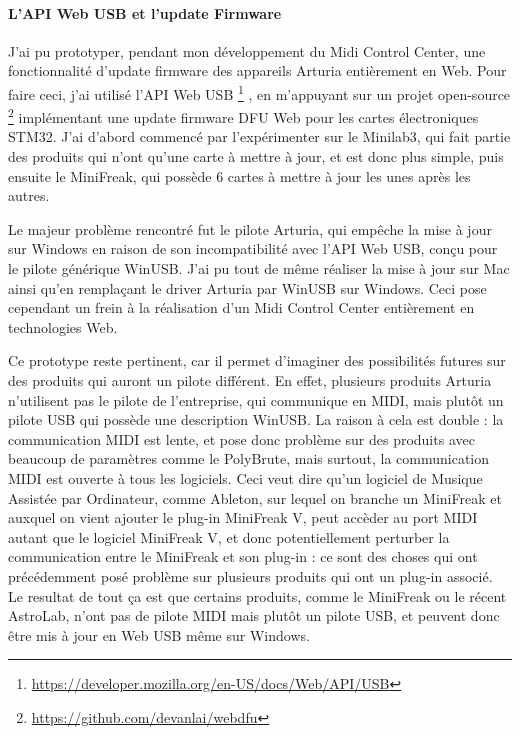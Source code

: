 \documentclass[francais]{rapportPFE}  %
\begin{document}
\paragraph{L'API Web USB et l'update Firmware}
J'ai pu prototyper, pendant mon développement du Midi Control Center, une fonctionnalité d'update firmware des appareils Arturia entièrement en Web. Pour faire ceci, j'ai utilisé l'API Web USB
\footnote{\url{https://developer.mozilla.org/en-US/docs/Web/API/USB}} 
, en m'appuyant sur un projet open-source 
\footnote{\url{https://github.com/devanlai/webdfu}} 
implémentant une update firmware DFU Web pour les cartes électroniques STM32.
J'ai d'abord commencé par l'expérimenter sur le Minilab3, qui fait partie des produits qui n'ont qu'une carte à mettre à jour, et est donc plus simple, puis ensuite le MiniFreak, qui possède 6 cartes à mettre à jour les unes après les autres.

Le majeur problème rencontré fut le pilote Arturia, qui empêche la mise à jour sur Windows en raison de son incompatibilité avec l'API Web USB, conçu pour le pilote générique WinUSB. J'ai pu tout de même réaliser la mise à jour sur Mac ainsi qu'en remplaçant le driver Arturia par WinUSB sur Windows. Ceci pose cependant un frein à la réalisation d'un Midi Control Center entièrement en technologies Web.

Ce prototype reste pertinent, car il permet d'imaginer des possibilités futures sur des produits qui auront un pilote différent.
En effet, plusieurs produits Arturia n'utilisent pas le pilote de l'entreprise, qui communique en MIDI, mais plutôt un pilote USB qui possède une description WinUSB. La raison à cela est double : la communication MIDI est lente, et pose donc problème sur des produits avec beaucoup de paramètres comme le PolyBrute, mais surtout, la communication MIDI est ouverte à tous les logiciels. Ceci veut dire qu'un logiciel de Musique Assistée par Ordinateur, comme Ableton, sur lequel on branche un MiniFreak et auxquel on vient ajouter le plug-in MiniFreak V, peut accèder au port MIDI autant que le logiciel MiniFreak V, et donc potentiellement perturber la communication entre le MiniFreak et son plug-in : ce sont des choses qui ont précédemment posé problème sur plusieurs produits qui ont un plug-in associé.
Le resultat de tout ça est que certains produits, comme le MiniFreak ou le récent AstroLab, n'ont pas de pilote MIDI mais plutôt un pilote USB, et peuvent donc être mis à jour en Web USB même sur Windows.
\end{document}
